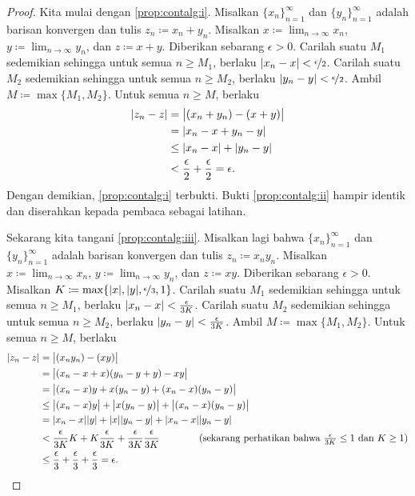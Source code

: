 \begin{proof}
Kita mulai dengan \ref{prop:contalg:i}.
Misalkan $\{ x_n \}_{n=1}^\infty$ dan $\{ y_n \}_{n=1}^\infty$ adalah barisan konvergen dan
tulis $z_n \coloneqq x_n + y_n$.  Misalkan $x \coloneqq \lim_{n\to\infty} x_n$,
$y \coloneqq \lim_{n\to\infty} y_n$, dan $z \coloneqq x+y$.
Diberikan sebarang $\epsilon > 0$.  
Carilah suatu $M_1$ sedemikian sehingga untuk semua $n \geq M_1$,
berlaku
$\lvert {x_n - x} \rvert < \nicefrac{\epsilon}{2}$.  
Carilah suatu $M_2$ sedemikian sehingga untuk semua $n \geq M_2$,
berlaku
$\lvert {y_n - y} \rvert < \nicefrac{\epsilon}{2}$.  Ambil $M \coloneqq \max \{ M_1, M_2 \}$.
Untuk semua $n \geq M$, berlaku
\begin{equation*}
\begin{split}
\lvert {z_n - z} \rvert &=
\bigl\lvert {(x_n+y_n) - (x+y)} \bigr\rvert \\
& =
\lvert {x_n-x + y_n-y} \rvert \\
& \leq
\lvert {x_n-x} \rvert + \lvert {y_n-y} \rvert \\
& <
\frac{\epsilon}{2} +
\frac{\epsilon}{2}
= \epsilon.
\end{split}
\end{equation*}
Dengan demikian, \ref{prop:contalg:i} terbukti.
Bukti \ref{prop:contalg:ii} hampir identik dan diserahkan kepada pembaca sebagai
latihan.

Sekarang kita tangani 
\ref{prop:contalg:iii}.
Misalkan lagi bahwa $\{ x_n \}_{n=1}^\infty$ dan $\{ y_n \}_{n=1}^\infty$ adalah barisan konvergen dan
tulis $z_n \coloneqq x_n y_n$.  Misalkan $x \coloneqq \lim_{n\to\infty} x_n$,
$y \coloneqq \lim_{n\to\infty} y_n$, dan $z \coloneqq xy$.
Diberikan sebarang $\epsilon > 0$.
Misalkan $K \coloneqq \max\{ \lvert {x} \rvert, \lvert {y} \rvert, \nicefrac{\epsilon}{3} , 1 \}$.
Carilah suatu $M_1$ sedemikian sehingga untuk semua $n \geq M_1$,
berlaku
$\lvert {x_n - x} \rvert < \frac{\epsilon}{3K}$.
Carilah suatu $M_2$ sedemikian sehingga untuk semua $n \geq M_2$,
berlaku
$\lvert {y_n - y} \rvert < \frac{\epsilon}{3K}$.  Ambil $M \coloneqq \max \{ M_1, M_2 \}$.
Untuk semua $n \geq M$, berlaku
\begin{equation*}
\begin{split}
\lvert {z_n - z} \rvert &=
\bigl\lvert {(x_ny_n) - (xy)} \bigr\rvert \\
& =
\bigl\lvert {(x_n-x+x)(y_n-y+y) - xy} \bigr\rvert \\
& =
\bigl\lvert {(x_n-x)y + x(y_n-y) +(x_n-x)(y_n-y)} \bigr\rvert \\
& \leq
\bigl\lvert {(x_n-x)y} \bigr\rvert + \bigl\lvert {x(y_n - y)} \bigr\rvert +
\bigl\lvert {(x_n-x)(y_n-y)} \bigr\rvert \\
& =
\lvert {x_n -x} \rvert\lvert {y} \rvert + 
\lvert {x} \rvert\lvert {y_n -y} \rvert + 
\lvert {x_n -x} \rvert\lvert {y_n -y} \rvert
\\
& <
\frac{\epsilon}{3K} K + 
K \frac{\epsilon}{3K} + 
\frac{\epsilon}{3K}
\frac{\epsilon}{3K}
\qquad \qquad \text{(sekarang perhatikan bahwa } \tfrac{\epsilon}{3K} \leq 1
\text{ dan }
K \geq 1\text{)}
\\
& \leq
\frac{\epsilon}{3} + \frac{\epsilon}{3} + \frac{\epsilon}{3}
 = \epsilon .
\end{split}
\end{equation*}


\end{proof}
